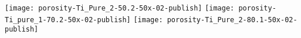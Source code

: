 \documentclass{standalone}
\begin{document}
\texttt{[image: porosity-Ti\_Pure\_2-50.2-50x-02-publish]}
\texttt{[image: porosity-Ti\_pure\_1-70.2-50x-02-publish]}
\texttt{[image: porosity-Ti\_Pure\_2-80.1-50x-02-publish]}
\end{document}
